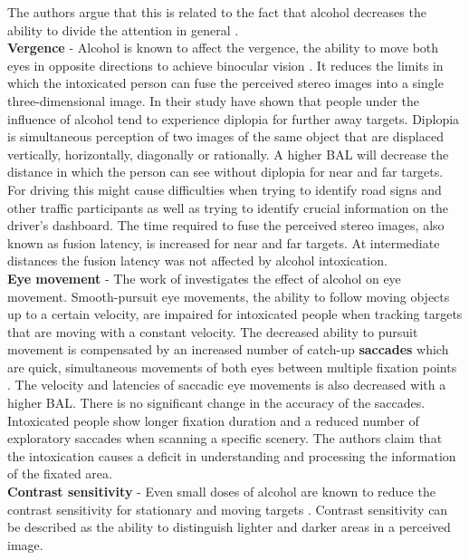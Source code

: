 The authors argue that this is related to the fact that alcohol decreases the ability to divide the attention in general \autocite{i1999effects}.
\\
\textbf{Vergence} - Alcohol is known to affect the vergence, the ability to move both eyes in opposite directions to achieve binocular vision \autocite{cassin1984dictionary}.
It reduces the limits in which the intoxicated person can fuse the perceived stereo images into a single three-dimensional image. 
In their study \textcite{miller1991effect} have shown that people under the influence of alcohol tend to experience diplopia for further away targets.
Diplopia is simultaneous perception of two images of the same object that are displaced vertically, horizontally, diagonally or rationally. \autocite[]{cassin1984dictionary}
A higher BAL will decrease the distance in which the person can see without diplopia for near and far targets.
For driving this might cause difficulties when trying to identify road signs and other traffic participants as well as trying to identify crucial information on the driver’s dashboard. 
The time required to fuse the perceived stereo images, also known as fusion latency, is increased for near and far targets. 
At intermediate distances the fusion latency was not affected by alcohol intoxication.
\\
\textbf{Eye movement} - The work of \textcite{moser1998effect} investigates the effect of alcohol on eye movement.
Smooth-pursuit eye movements, the ability to follow moving objects up to a certain velocity, are impaired for intoxicated people when tracking targets that are moving with a constant velocity. 
The decreased ability to pursuit movement is compensated by an increased number of catch-up \textbf{saccades} which are quick, simultaneous movements of both eyes between multiple fixation points \autocite{cassin1984dictionary}.
The velocity and latencies of saccadic eye movements is also decreased with a higher BAL.
There is no significant change in the accuracy of the saccades.
Intoxicated people show longer fixation duration and a reduced number of exploratory saccades when scanning a specific scenery.
The authors claim that the intoxication causes a deficit in understanding and processing the information of the fixated area.
\\
\textbf{Contrast sensitivity} - Even small doses of alcohol are known to reduce the contrast sensitivity for stationary and moving targets \autocite{nicholson1995effects}.
Contrast sensitivity can be described as the ability to distinguish lighter and darker areas in a perceived image.
